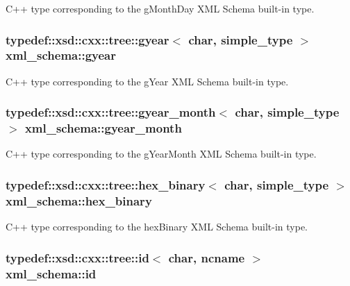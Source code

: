 C++ type corresponding to the g\-Month\-Day X\-M\-L Schema built-\/in type. 

\hypertarget{namespacexml__schema_a180526e3ae3592e56a0037c1f2ec8e5b}{
\subsubsection[{gyear}]{\setlength{\rightskip}{0pt plus 5cm}typedef\-::xsd\-::cxx\-::tree\-::gyear$<$ char, {\bf simple\-\_\-type} $>$ {\bf xml\-\_\-schema\-::gyear}}}\label{namespacexml__schema_a180526e3ae3592e56a0037c1f2ec8e5b}


C++ type corresponding to the g\-Year X\-M\-L Schema built-\/in type. 

\hypertarget{namespacexml__schema_a8da9330a638589b1ef456991753a2804}{
\subsubsection[{gyear\-\_\-month}]{\setlength{\rightskip}{0pt plus 5cm}typedef\-::xsd\-::cxx\-::tree\-::gyear\-\_\-month$<$ char, {\bf simple\-\_\-type} $>$ {\bf xml\-\_\-schema\-::gyear\-\_\-month}}}\label{namespacexml__schema_a8da9330a638589b1ef456991753a2804}


C++ type corresponding to the g\-Year\-Month X\-M\-L Schema built-\/in type. 

\hypertarget{namespacexml__schema_ac9db22d87610e02355669749770fac89}{
\subsubsection[{hex\-\_\-binary}]{\setlength{\rightskip}{0pt plus 5cm}typedef\-::xsd\-::cxx\-::tree\-::hex\-\_\-binary$<$ char, {\bf simple\-\_\-type} $>$ {\bf xml\-\_\-schema\-::hex\-\_\-binary}}}\label{namespacexml__schema_ac9db22d87610e02355669749770fac89}


C++ type corresponding to the hex\-Binary X\-M\-L Schema built-\/in type. 

\hypertarget{namespacexml__schema_a551698f0c4c57e5e194dc1f2892da3ef}{
\subsubsection[{id}]{\setlength{\rightskip}{0pt plus 5cm}typedef\-::xsd\-::cxx\-::tree\-::id$<$ char, {\bf ncname} $>$ {\bf xml\-\_\-schema\-::id}}}\label{namespacexml__schema_a551698f0c4c57e5e194dc1f2892da3ef}


